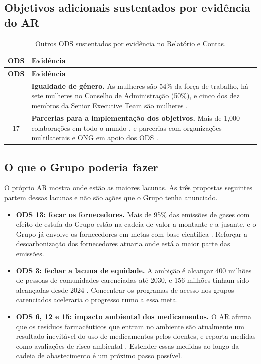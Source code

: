 \subsection{Objetivos adicionais sustentados por evidência do AR}

\begin{xltabular}{\linewidth}{@{}cY@{}}
\caption{Outros ODS sustentados por evidência no Relatório e Contas.}\label{tab:ods-adicionais}\\*
\toprule
\textbf{ODS} & \textbf{Evidência} \\*
\midrule
\endfirsthead
\toprule
\textbf{ODS} & \textbf{Evidência} \\*
\midrule
\endhead
\bottomrule
{} & \textbf{Igualdade de género.} As mulheres são 54\% da força de trabalho, há sete mulheres no Conselho de Administração (50\%), e cinco dos dez membros da Senior Executive Team são mulheres \cite[p.~39]{AR}. \\
17 & \textbf{Parcerias para a implementação dos objetivos.} Mais de 1,000 colaborações em todo o mundo \cite[p.~37]{AR}, e parcerias com organizações multilaterais e ONG em apoio dos ODS \cite[p.~76]{AR}. \\
\end{xltabular}

\subsection{O que o Grupo poderia fazer}

O próprio AR mostra onde estão as maiores lacunas. As três propostas seguintes partem dessas lacunas e não são ações que o Grupo tenha anunciado.

\begin{analysis}
\begin{itemize}[leftmargin=*,nosep]
\item \textbf{ODS 13: focar os fornecedores.} Mais de 95\% das emissões de gases com efeito de estufa do Grupo estão na cadeia de valor a montante e a jusante, e o Grupo já envolve os fornecedores em metas com base científica \cite[p.~42]{AR}. Reforçar a descarbonização dos fornecedores atuaria onde está a maior parte das emissões.
\item \textbf{ODS 3: fechar a lacuna de equidade.} A ambição é alcançar 400 milhões de pessoas de comunidades carenciadas até 2030, e 156 milhões tinham sido alcançadas desde 2024 \cite[pp.~5, 41]{AR}. Concentrar os programas de acesso nos grupos carenciados aceleraria o progresso rumo a essa meta.
\item \textbf{ODS 6, 12 e 15: impacto ambiental dos medicamentos.} O AR afirma que os resíduos farmacêuticos que entram no ambiente são atualmente um resultado inevitável do uso de medicamentos pelos doentes, e reporta medidas como avaliações de risco ambiental \cite[p.~45]{AR}. Estender essas medidas ao longo da cadeia de abastecimento é um próximo passo possível.
\end{itemize}
\end{analysis}
